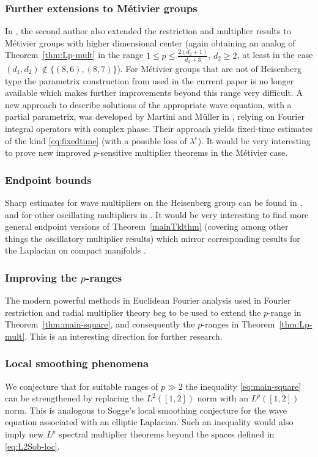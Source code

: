 \documentclass[leqno]{amsart}
\theoremstyle{definition}
\theoremstyle{remark}
\numberwithin{equation}{section}
\newcommand{\eps}{\varepsilon}
\newcommand\la{{\lambda}}
\begin{document}
\subsubsection*{Further extensions to Métivier groups}
In \cite{Ni23-restr}, \cite{Ni25Studia} the second author also extended the  restriction and multiplier results to Métivier groups with higher dimensional center (again obtaining an analog of Theorem~\ref{thm:Lp-mult} in the range $1\le p\le  \frac{2(d_2+1)}{d_2+3}$, $d_2\ge 2$, at least in the case $(d_1,d_2)\notin\{(8,6), (8,7)\}$). For Métivier groups that are not of Heisenberg type the parametrix construction from \cite{MuellerSeeger2015} used in the current paper is  no longer available which makes further improvements beyond this range  very difficult. A new approach to describe solutions of the appropriate wave equation, with a partial parametrix,   was developed by Martini and Müller in \cite{MartiniMueller-Metivier}, relying on Fourier integral operators with complex phase.   Their approach yields fixed-time estimates of the kind \eqref{eq:fixedtime} (with a possible loss of $\la^\eps$).  It would be very interesting to prove new  improved  $p$-sensitive multiplier theorems in the  Métivier case. 

\subsubsection*{Endpoint bounds}
Sharp  estimates for wave multipliers on the Heisenberg group  can be found in \cite{MuellerSeeger2015}, and for other oscillating multipliers  in \cite{Bramati-etal}. It would be very interesting to find more general endpoint versions of Theorem~\ref{mainTklthm} (covering among other things the oscillatory multiplier results) which mirror corresponding   results 
for the Laplacian on  compact manifolds \cite{See91-Indiana, KimJongchon18}.

\subsubsection*{Improving the $p$-ranges}
The modern powerful methods in Euclidean Fourier analysis used in Fourier restriction and radial multiplier theory beg to be  used to extend the $p$-range in Theorem~\ref{thm:main-square},  and consequently the $p$-ranges in Theorem~\ref{thm:Lp-mult}.  This is an  interesting direction for further  research.


\subsubsection*{Local smoothing phenomena}
We conjecture that for suitable ranges of $p\gg 2$ the inequality  \eqref{eq:main-square}  can be strengthened  by replacing the  $L^2([1,2])$ norm with  an $L^p([1,2])$ norm. This is  analogous to Sogge's local smoothing conjecture \cite{Sogge91} for the wave equation associated with an elliptic Laplacian. Such an inequality  would also imply new $L^p$ spectral multiplier theorems beyond the spaces defined in \eqref{eq:L2Sob-loc}.
\end{document}
